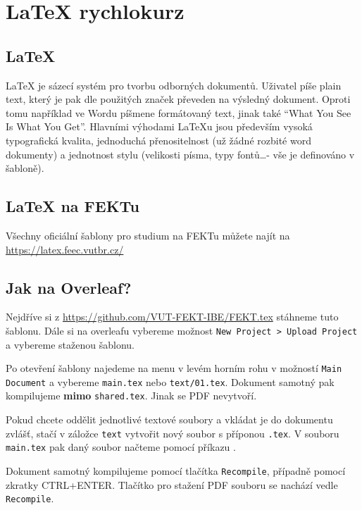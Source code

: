 \section{LaTeX rychlokurz}
\subsection{\LaTeX}
LaTeX je sázecí systém pro tvorbu odborných dokumentů. Uživatel píše plain text, který je pak dle použitých značek převeden na výsledný dokument. Oproti tomu například ve Wordu píšmene formátovaný text, jinak také \enquote{What You See Is What You Get}. Hlavními výhodami LaTeXu jsou především vysoká typografická kvalita, jednoduchá přenositelnost (už žádné rozbité word dokumenty) a jednotnost stylu (velikosti písma, typy fontů\dots - vše je definováno v šabloně).

\subsection{LaTeX na FEKTu}
Všechny oficiální šablony pro studium na FEKTu můžete najít na 
\url{https://latex.feec.vutbr.cz/}

\subsection{Jak na Overleaf?}
Nejdříve si z \url{https://github.com/VUT-FEKT-IBE/FEKT.tex}
stáhneme tuto šablonu. Dále si na overleafu vybereme možnost \texttt{New Project > Upload Project} a vybereme staženou šablonu.

Po otevření šablony najedeme na menu v levém horním rohu v možností \texttt{Main Document} a vybereme \texttt{main.tex} nebo \texttt{text/01.tex}. Dokument samotný pak kompilujeme \textbf{mimo} \texttt{shared.tex}. Jinak se PDF nevytvoří.

Pokud chcete oddělit jednotlivé textové soubory a vkládat je do dokumentu zvlášť, stačí v záložce \texttt{text} vytvořit nový soubor s příponou \texttt{.tex}. V souboru \texttt{main.tex} pak daný soubor načteme pomocí příkazu \verb||.

Dokument samotný kompilujeme pomocí tlačítka \texttt{Recompile}, případně pomocí zkratky CTRL+ENTER. Tlačítko pro stažení PDF souboru se nachází vedle \texttt{Recompile}.


